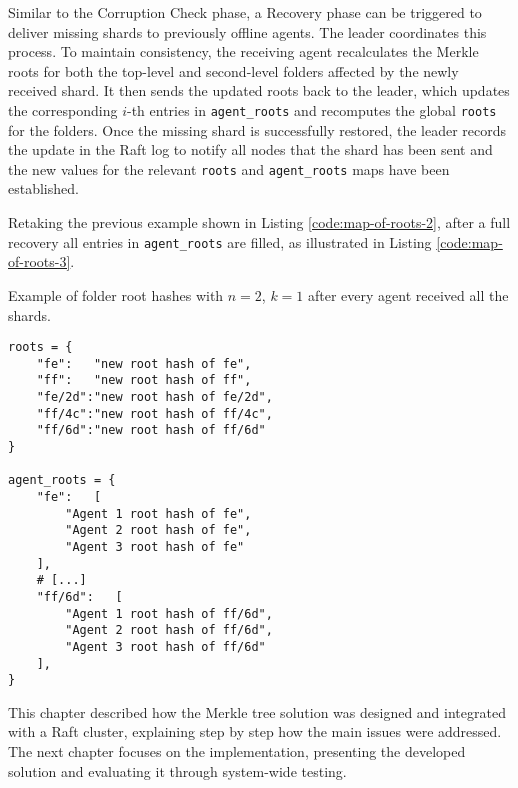Similar to the Corruption Check phase, a Recovery phase can be triggered to deliver missing shards to previously offline agents. The leader coordinates this process. To maintain consistency, the receiving agent recalculates the Merkle roots for both the top-level and second-level folders affected by the newly received shard. It then sends the updated roots back to the leader, which updates the corresponding $i$-th entries in \texttt{agent\_roots} and recomputes the global \texttt{roots} for the folders. Once the missing shard is successfully restored, the leader records the update in the Raft log to notify all nodes that the shard has been sent and the new values for the relevant \texttt{roots} and \texttt{agent\_roots} maps have been established.

Retaking the previous example shown in Listing \ref{code:map-of-roots-2}, after a full recovery all entries in \texttt{agent\_roots} are filled, as illustrated in Listing \ref{code:map-of-roots-3}.

\begin{listing}[H]
\caption{Example of folder root hashes with $n=2$, $k=1$ after every agent received all the shards.}
\label{code:map-of-roots-3}
\begin{verbatim}
roots = {
    "fe":   "new root hash of fe",
    "ff":   "new root hash of ff",
    "fe/2d":"new root hash of fe/2d",
    "ff/4c":"new root hash of ff/4c",
    "ff/6d":"new root hash of ff/6d"
}

agent_roots = {
    "fe":   [
        "Agent 1 root hash of fe",
        "Agent 2 root hash of fe",
        "Agent 3 root hash of fe"
    ],
    # [...]
    "ff/6d":   [
        "Agent 1 root hash of ff/6d",
        "Agent 2 root hash of ff/6d",
        "Agent 3 root hash of ff/6d"
    ],
}
\end{verbatim}
\end{listing}

This chapter described how the Merkle tree solution was designed and integrated with a Raft cluster, explaining step by step how the main issues were addressed. The next chapter focuses on the implementation, presenting the developed solution and evaluating it through system-wide testing.